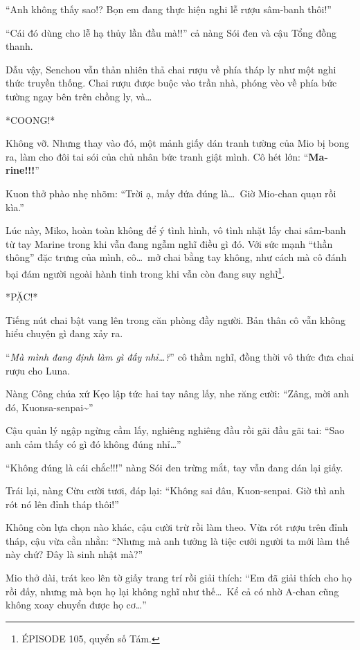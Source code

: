 \documentclass[../main.tex]{subfiles}
\begin{document}
``Anh không thấy sao!? Bọn em đang thực hiện nghi lễ rượu sâm-banh thôi!''

``Cái đó dùng cho lễ hạ thủy lần đầu mà!!'' cả nàng Sói đen và cậu Tổng đồng thanh.

Dẫu vậy, Senchou vẫn thản nhiên thả chai rượu về phía tháp ly như một nghi thức truyền thống. Chai rượu được buộc vào trần nhà, phóng vèo về phía bức tường ngay bên trên chồng ly, và\dots

*COONG!*

Không vỡ. Nhưng thay vào đó, một mảnh giấy dán tranh tường của Mio bị bong ra, làm cho đôi tai sói của chủ nhân bức tranh giật mình. Cô hét lớn: ``\textbf{Ma-rine!!!}''

Kuon thở phào nhẹ nhõm: ``Trời ạ, mấy đứa đúng là\dots\ Giờ Mio-chan quạu rồi kìa.''

Lúc này, Miko, hoàn toàn không để ý tình hình, vô tình nhặt lấy chai sâm-banh từ tay Marine trong khi vẫn đang ngẫm nghĩ điều gì đó. Với sức mạnh ``thần thông'' đặc trưng của mình, cô\dots\ mở chai bằng tay không, như cách mà cô đánh bại đám người ngoài hành tinh trong khi vẫn còn đang suy nghĩ\footnote{{\flaregothic ÉPISODE 105}, quyển số Tám.}.

*PẶC!*

Tiếng nút chai bật vang lên trong căn phòng đầy người. Bản thân cô vẫn không hiểu chuyện gì đang xảy ra.

``\textit{Mà mình đang định làm gì đấy nhỉ\dots?}'' cô thầm nghĩ, đồng thời vô thức đưa chai rượu cho Luna.

Nàng Công chúa xứ Kẹo lập tức hai tay nâng lấy, nhe răng cười: ``Zâng, mời anh đó, Kuonsa-senpai\~{}''

Cậu quản lý ngập ngừng cầm lấy, nghiêng nghiêng đầu rồi gãi đầu gãi tai: ``Sao anh cảm thấy có gì đó không đúng nhỉ\dots''

``Không đúng là cái chắc!!!'' nàng Sói đen trừng mắt, tay vẫn đang dán lại giấy.

Trái lại, nàng Cừu cười tươi, đáp lại: ``Không sai đâu, Kuon-senpai. Giờ thì anh rót nó lên đỉnh tháp thôi!''

Không còn lựa chọn nào khác, cậu cười trừ rồi làm theo. Vừa rót rượu trên đỉnh tháp, cậu vừa cằn nhằn: ``Nhưng mà anh tưởng là tiệc cưới người ta mới làm thế này chứ? Đây là sinh nhật mà?''

Mio thở dài, trát keo lên tờ giấy trang trí rồi giải thích: ``Em đã giải thích cho họ rồi đấy, nhưng mà bọn họ lại không nghĩ như thế\dots\ Kể cả có nhờ A-chan cũng không xoay chuyển được họ cơ\dots''
\end{document}
